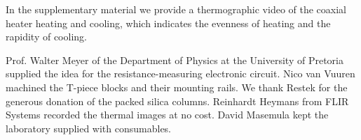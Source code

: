 \documentclass[aip,rsi,preprint,graphicx]{revtex4-1} %
\begin{document}
In the supplementary material we provide a thermographic video of the coaxial
heater heating and cooling, which indicates the evenness of heating and the
rapidity of cooling.


\begin{acknowledgments}

Prof. Walter Meyer of the Department of Physics at the University of Pretoria
supplied the idea for the resistance-measuring electronic circuit. Nico van
Vuuren machined the T-piece blocks and their mounting rails. We thank Restek for
the generous donation of the packed silica columns. Reinhardt Heymans from FLIR
Systems recorded the thermal images at no cost. David Masemula kept the
laboratory supplied with consumables.

\end{acknowledgments}


\end{document}
